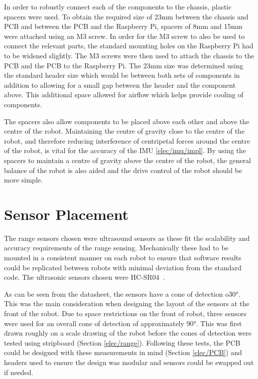 In order to robustly connect each of the components to the 
chassis, plastic spacers were used. To obtain the required size 
of 23mm  between the chassis and PCB 
and between the PCB and the Raspberry Pi, spacers of 8mm and 15mm 
were attached using an M3 screw. In order for the M3 screw to also 
be used to connect the relevant parts, the standard mounting holes 
on the Raspberry Pi had to be widened slightly. The M3 screws were 
then used to attach the chassis to the PCB and the PCB to the 
Raspberry Pi. The 23mm size was determined using the standard 
header size which would be between both sets of components in 
addition to allowing for a small gap between the header and the 
component above. This additional space allowed for airflow which 
helps provide cooling of components. 

The spacers also allow components to be placed above each other 
and above the centre of the robot. Maintaining the centre of 
gravity close to the centre of the robot, and therefore reducing 
interference of centripetal forces around the centre of the robot, 
is vital for the accuracy of the IMU \ref{elec/imu/impl}. By using 
the spacers to maintain a centre of gravity above the centre of the 
robot, the general balance of the robot is also aided and the drive 
control of the robot should be more simple.    

\section{Sensor Placement}\label{mech/sensors}
The range sensors chosen were ultrasound sensors as these fit the
scalability and accuracy requirements of the range sensing. 
Mechanically these had to be mounted in a consistent manner on each 
robot to ensure that software results could be replicated between 
robots with minimal deviation from the standard code. The ultrasonic 
sensors chosen were HC-SR04~\cite{HCSR04datasheet}.

As can be seen from the datasheet, the sensors have a cone of 
detection o\ang{30}. This was the main consideration when designing 
the layout of the sensors at the front of the robot. Due to space 
restrictions on the front of robot, three sensors were used for an 
overall cone of detection of approximately \ang{90}. This was first 
drawn roughly on a scale drawing of the robot before the cones of 
detection were tested using stripboard (Section \ref{elec/range}). 
Following these tests, the PCB could be designed with these measurements 
in mind (Section \ref{elec/PCB}) and headers used to ensure the design 
was modular and sensors could be swapped out if needed. 

